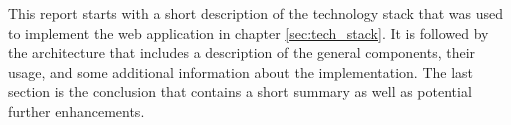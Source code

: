 This report starts with a short description of the technology stack that was used to implement the web application in chapter \ref{sec:tech_stack}. It is followed by the architecture that includes a description of the general components, their usage, and some additional information about the implementation. The last section is the conclusion that contains a short summary as well as potential further enhancements.